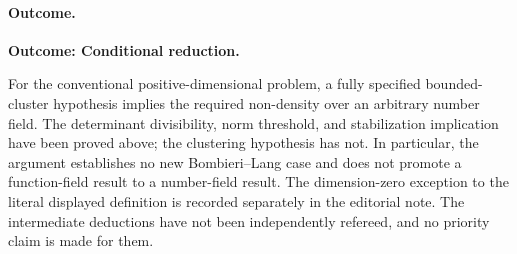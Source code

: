 \documentclass[11pt,a4paper]{article}
\numberwithin{equation}{section}
\begin{document}
\paragraph{Outcome.}
\textbf{Outcome: Conditional reduction.}

For the conventional positive-dimensional problem, a fully specified bounded-cluster hypothesis implies the required non-density over an arbitrary number field. The determinant divisibility, norm threshold, and stabilization implication have been proved above; the clustering hypothesis has not. In particular, the argument establishes no new Bombieri--Lang case and does not promote a function-field result to a number-field result. The dimension-zero exception to the literal displayed definition is recorded separately in the editorial note. The intermediate deductions have not been independently refereed, and no priority claim is made for them.
\end{document}
